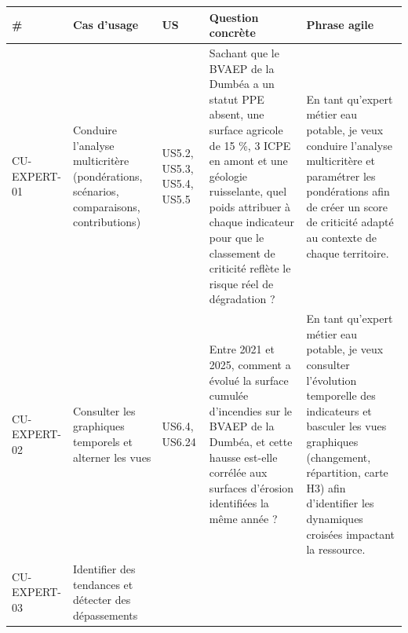 \documentclass[
  paper=a4,
  oneside  ,captions=tableheading
]{scrartcl}
\begin{document}
{\def\LTcaptype{none} %
\begin{longtable}[]{@{}
  >{\raggedright\arraybackslash}p{}
  >{\raggedright\arraybackslash}p{}
  >{\raggedright\arraybackslash}p{}
  >{\raggedright\arraybackslash}p{}
  >{\raggedright\arraybackslash}p{}@{}}
\toprule\noalign{}
\begin{minipage}[b]{\linewidth}\raggedright
\#
\end{minipage} & \begin{minipage}[b]{\linewidth}\raggedright
Cas d'usage
\end{minipage} & \begin{minipage}[b]{\linewidth}\raggedright
US
\end{minipage} & \begin{minipage}[b]{\linewidth}\raggedright
Question concrète
\end{minipage} & \begin{minipage}[b]{\linewidth}\raggedright
Phrase agile
\end{minipage} \\
\midrule\noalign{}
\endhead
\bottomrule\noalign{}
\endlastfoot
CU-EXPERT-01 & Conduire l'analyse multicritère (pondérations, scénarios,
comparaisons, contributions) & US5.2, US5.3, US5.4, US5.5 & Sachant que
le BVAEP de la Dumbéa a un statut PPE absent, une surface agricole de 15
\%, 3 ICPE en amont et une géologie ruisselante, quel poids attribuer à
chaque indicateur pour que le classement de criticité reflète le risque
réel de dégradation ? & En tant qu'expert métier eau potable, je veux
conduire l'analyse multicritère et paramétrer les pondérations afin de
créer un score de criticité adapté au contexte de chaque territoire. \\
CU-EXPERT-02 & Consulter les graphiques temporels et alterner les vues &
US6.4, US6.24 & Entre 2021 et 2025, comment a évolué la surface cumulée
d'incendies sur le BVAEP de la Dumbéa, et cette hausse est-elle corrélée
aux surfaces d'érosion identifiées la même année ? & En tant qu'expert
métier eau potable, je veux consulter l'évolution temporelle des
indicateurs et basculer les vues graphiques (changement, répartition,
carte H3) afin d'identifier les dynamiques croisées impactant la
ressource. \\
CU-EXPERT-03 & Identifier des tendances et détecter des dépassements &

\end{longtable}}
\end{document}
